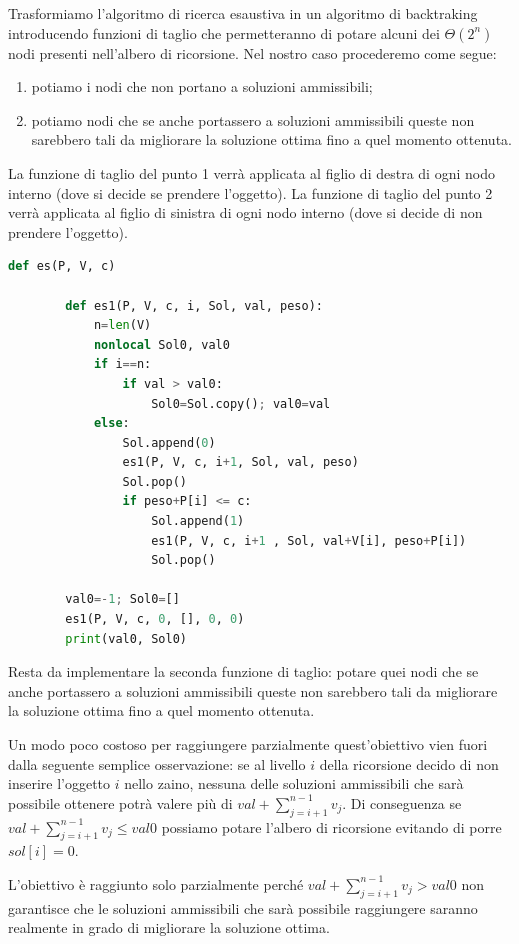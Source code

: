 Trasformiamo l'algoritmo di ricerca esaustiva in un algoritmo di backtraking introducendo funzioni di taglio che permetteranno di potare alcuni dei $\Theta(2^n)$ nodi presenti nell'albero di ricorsione. Nel nostro caso procederemo come segue: 
\begin{enumerate}
    \item potiamo i nodi che non portano a soluzioni ammissibili; 
    \item potiamo nodi che se anche portassero a soluzioni ammissibili queste non sarebbero tali da migliorare la soluzione ottima fino a quel momento ottenuta. 
\end{enumerate}
La funzione di taglio del punto 1 verrà applicata al figlio di destra di ogni nodo interno (dove si decide se prendere l'oggetto). La funzione di taglio del punto 2 verrà applicata al figlio di sinistra di ogni nodo interno (dove si decide di non prendere l'oggetto).

\begin{lstlisting}[language=Python]
    def es(P, V, c)
        
        def es1(P, V, c, i, Sol, val, peso):
            n=len(V)
            nonlocal Sol0, val0
            if i==n:
                if val > val0:
                    Sol0=Sol.copy(); val0=val
            else:
                Sol.append(0)
                es1(P, V, c, i+1, Sol, val, peso)
                Sol.pop()
                if peso+P[i] <= c:
                    Sol.append(1)
                    es1(P, V, c, i+1 , Sol, val+V[i], peso+P[i])
                    Sol.pop()
        
        val0=-1; Sol0=[]
        es1(P, V, c, 0, [], 0, 0)
        print(val0, Sol0)
\end{lstlisting}

Resta da implementare la seconda funzione di taglio: potare quei nodi che se anche portassero a soluzioni ammissibili queste non sarebbero tali da migliorare la soluzione ottima fino a quel momento ottenuta.

Un modo poco costoso per raggiungere parzialmente quest'obiettivo vien fuori dalla seguente semplice osservazione: se al livello $i$ della ricorsione decido di non inserire l'oggetto $i$ nello zaino, nessuna delle soluzioni ammissibili che sarà possibile ottenere potrà valere più di $val+\sum^{n-1}_{j=i+1}v_j$. Di conseguenza se $val+\sum^{n-1}_{j=i+1}v_j\leq val0$ possiamo potare l'albero di ricorsione evitando di porre $sol[i] = 0$.

L'obiettivo è raggiunto solo parzialmente perché $val+\sum^{n-1}_{j=i+1}v_j>val0$ non garantisce che le soluzioni ammissibili che sarà possibile raggiungere saranno realmente in grado di migliorare la soluzione ottima.

